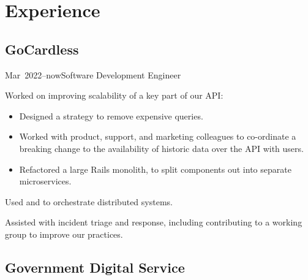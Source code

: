 \documentclass[a4paper]{barrucadu-cv}
\newcommand{\range}[2]{#1–#2}
\newcommand{\orange}[1]{\range{#1}{now}}
\begin{document}
\section{Experience}

\subsection{GoCardless}
\begin{cventry}{\orange{Mar~2022}}{Software Development Engineer}
  \begin{tightitemize}
    \item Worked on improving scalability of a key part of our API:

      \begin{itemize}
      \item Designed a  strategy to remove expensive queries.
      \item Worked with product, support, and marketing colleagues to co-ordinate a breaking change to the availability of historic data over the API with users.
      \item Refactored a large Rails monolith, to split components out into separate microservices.
      \end{itemize}
  \item Used  and  to orchestrate distributed systems.
  \item Assisted with incident triage and response, including contributing to a working group to improve our practices.
  \end{tightitemize}
\end{cventry}

\subsection{Government Digital Service}
\end{document}
